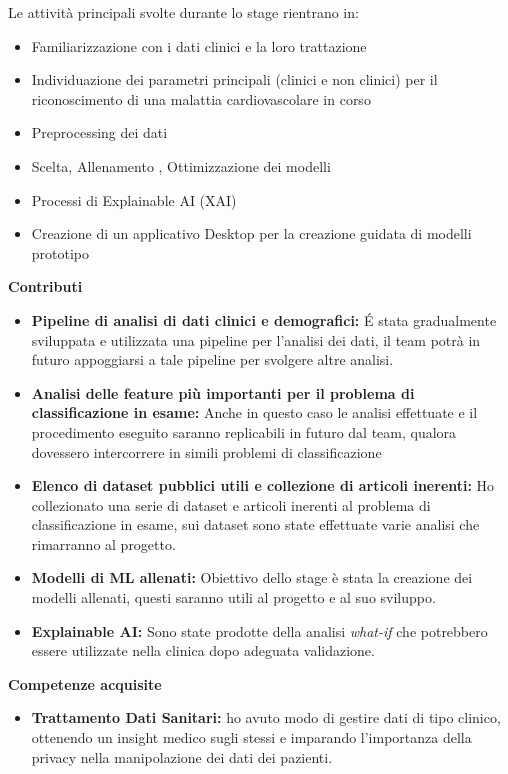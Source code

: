 \begin{flushleft}
\begin{flushleft}
Le attività principali svolte durante lo stage rientrano in:
\begin{itemize}
\item Familiarizzazione con i dati clinici e la loro trattazione
\item Individuazione dei parametri principali (clinici e non clinici)  per il riconoscimento di una malattia cardiovascolare in corso
\item Preprocessing dei dati
\item Scelta, Allenamento , Ottimizzazione dei modelli
\item Processi di Explainable AI (XAI)
\item Creazione di un applicativo Desktop per la creazione guidata di modelli prototipo
\end{itemize}

\textbf{Contributi}
\begin{itemize}
\item \textbf{Pipeline di analisi di dati clinici e demografici:}
    É stata gradualmente sviluppata e utilizzata una pipeline per l'analisi dei dati, il team potrà in futuro appoggiarsi a tale pipeline per svolgere altre analisi.

\item \textbf{ Analisi delle feature più importanti per il problema di classificazione in esame:}
    Anche in questo caso le analisi effettuate e il procedimento eseguito saranno replicabili in futuro dal team, qualora dovessero intercorrere in simili problemi di classificazione
    
\item \textbf{Elenco di dataset pubblici utili e collezione di articoli inerenti:}
    Ho collezionato una serie di dataset e articoli inerenti al  problema di classificazione in esame, sui dataset sono state effettuate varie analisi che rimarranno al progetto. 
\item \textbf{Modelli di ML allenati:}
    Obiettivo dello stage è stata la creazione dei modelli allenati, questi saranno utili al progetto e al suo sviluppo.
    \item \textbf{Explainable AI:}
Sono state prodotte della analisi \emph{what-if} che potrebbero essere utilizzate nella clinica dopo adeguata validazione.
\end{itemize}

\textbf{Competenze acquisite}
\begin{itemize}

\item \textbf{Trattamento Dati Sanitari:}
ho avuto modo di gestire dati di tipo clinico, ottenendo un insight medico sugli stessi e imparando l'importanza della privacy nella manipolazione dei dati dei pazienti.


\end{itemize}
\end{flushleft}
\end{flushleft}
